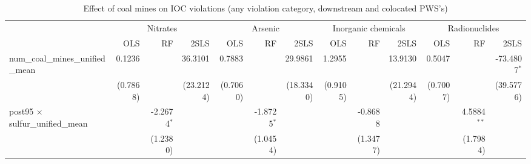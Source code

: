 
\begin{table}[htbp]
   
   \caption{\label{2sls_dwnstrmcolocate_minevio_allcat} Effect of coal mines on IOC violations (any violation category, downstream and colocated PWS's)}
   \bigskip
   
   \centering
   
   \begin{adjustbox}{width = \textwidth, center}
      
      
      \begin{tabular}{lrrrrrrrrrrrr}
         \toprule
         
          & \multicolumn{3}{c}{Nitrates} & \multicolumn{3}{c}{Arsenic} & \multicolumn{3}{c}{Inorganic chemicals} & \multicolumn{3}{c}{Radionuclides}\\
         
                                                                            & OLS                   & RF            & 2SLS      & OLS      & RF            & 2SLS      & OLS      & RF                    & 2SLS                  & OLS                   & RF            & 2SLS\\  
         
         \midrule 
         num\_coal\_mines\_unified\_mean                                    & 0.1236                &               & 36.3101   & 0.7883   &               & 29.9861   & 1.2955   &                       & 13.9130               & 0.5047                &               & -73.4807$^{*}$\\   
                                                                            & (0.7868)              &               & (23.2124) & (0.7060) &               & (18.3340) & (0.9105) &                       & (21.2944)             & (0.7007)              &               & (39.5776)\\   
         post95 $\times$ sulfur\_unified\_mean                              &                       & -2.2674$^{*}$ &           &          & -1.8725$^{*}$ &           &          & -0.8688               &                       &                       & 4.5884$^{**}$ &   \\   
                                                                            &                       & (1.2380)      &           &          & (1.0454)      &           &          & (1.3477)              &                       &                       & (1.7984)      &   \\   
         

\end{tabular}
\end{adjustbox}
\end{table}
